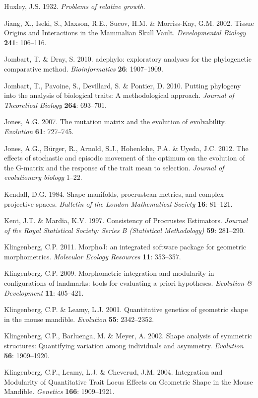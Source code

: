 \documentclass[12pt,twoside]{report}
\begin{document}
Huxley, J.S. 1932. \emph{Problems of relative growth}.

Jiang, X., Iseki, S., Maxson, R.E., Sucov, H.M. \& Morriss-Kay, G.M.
2002. Tissue Origins and Interactions in the Mammalian Skull Vault.
\emph{Developmental Biology} \textbf{241}: 106--116.

Jombart, T. \& Dray, S. 2010. adephylo: exploratory analyses for the
phylogenetic comparative method. \emph{Bioinformatics} \textbf{26}:
1907--1909.

Jombart, T., Pavoine, S., Devillard, S. \& Pontier, D. 2010. Putting
phylogeny into the analysis of biological traits: A methodological
approach. \emph{Journal of Theoretical Biology} \textbf{264}: 693--701.

Jones, A.G. 2007. The mutation matrix and the evolution of evolvability.
\emph{Evolution} \textbf{61}: 727--745.

Jones, A.G., Bürger, R., Arnold, S.J., Hohenlohe, P.A. \& Uyeda, J.C.
2012. The effects of stochastic and episodic movement of the optimum on
the evolution of the G-matrix and the response of the trait mean to
selection. \emph{Journal of evolutionary biology} 1--22.

Kendall, D.G. 1984. Shape manifolds, procrustean metrics, and complex
projective spaces. \emph{Bulletin of the London Mathematical Society}
\textbf{16}: 81--121.

Kent, J.T. \& Mardia, K.V. 1997. Consistency of Procrustes Estimators.
\emph{Journal of the Royal Statistical Society: Series B (Statistical
Methodology)} \textbf{59}: 281--290.

Klingenberg, C.P. 2011. MorphoJ: an integrated software package for
geometric morphometrics. \emph{Molecular Ecology Resources} \textbf{11}:
353--357.

Klingenberg, C.P. 2009. Morphometric integration and modularity in
configurations of landmarks: tools for evaluating a priori hypotheses.
\emph{Evolution \& Development} \textbf{11}: 405--421.

Klingenberg, C.P. \& Leamy, L.J. 2001. Quantitative genetics of
geometric shape in the mouse mandible. \emph{Evolution} \textbf{55}:
2342--2352.

Klingenberg, C.P., Barluenga, M. \& Meyer, A. 2002. Shape analysis of
symmetric structures: Quantifying variation among individuals and
asymmetry. \emph{Evolution} \textbf{56}: 1909--1920.

Klingenberg, C.P., Leamy, L.J. \& Cheverud, J.M. 2004. Integration and
Modularity of Quantitative Trait Locus Effects on Geometric Shape in the
Mouse Mandible. \emph{Genetics} \textbf{166}: 1909--1921.
\end{document}
